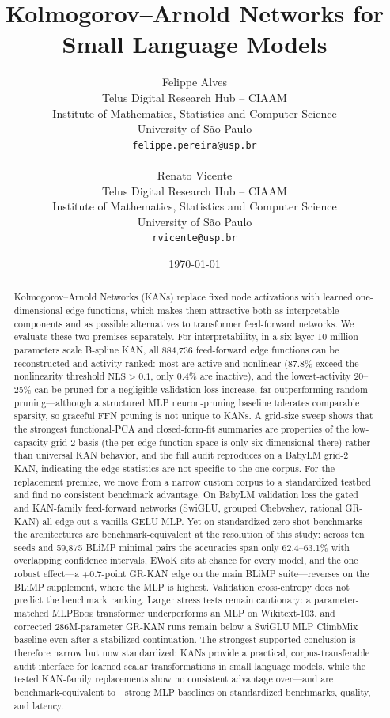 \documentclass[11pt]{article}
\title{Kolmogorov--Arnold Networks for Small Language Models}
\author{%
  Felippe Alves \\
  Telus Digital Research Hub -- CIAAM \\
  Institute of Mathematics, Statistics and Computer Science \\
  University of São Paulo \\
  \texttt{felippe.pereira@usp.br}\\
  \\
  Renato Vicente \\
  Telus Digital Research Hub -- CIAAM \\
  Institute of Mathematics, Statistics and Computer Science \\
  University of São Paulo \\
  \texttt{rvicente@usp.br}
}
\date{\today}
\newcommand{\modelname}[1]{\textsc{#1}}
\newcommand{\nls}{\mathrm{NLS}}
\newcommand{\grkan}{\modelname{GR-KAN}}
\newcommand{\mlpedge}{\modelname{MLPEdge}}
\begin{document}
\maketitle

\begin{abstract}
Kolmogorov--Arnold Networks (KANs) replace fixed node activations with learned one-dimensional edge functions, which makes them attractive both as interpretable components and as possible alternatives to transformer feed-forward networks. We evaluate these two premises separately. For interpretability, in a six-layer 10 million parameters scale B-spline KAN, all 884,736 feed-forward edge functions can be reconstructed and activity-ranked: most are active and nonlinear (87.8\% exceed the nonlinearity threshold \(\nls>0.1\), only 0.4\% are inactive), and the lowest-activity 20--25\% can be pruned for a negligible validation-loss increase, far outperforming random pruning---although a structured MLP neuron-pruning baseline tolerates comparable sparsity, so graceful FFN pruning is not unique to KANs. A grid-size sweep shows that the strongest functional-PCA and closed-form-fit summaries are properties of the low-capacity grid-2 basis (the per-edge function space is only six-dimensional there) rather than universal KAN behavior, and the full audit reproduces on a BabyLM grid-2 KAN, indicating the edge statistics are not specific to the one corpus. For the replacement premise, we move from a narrow custom corpus to a standardized testbed and find no consistent benchmark advantage. On BabyLM validation loss the gated and KAN-family feed-forward networks (SwiGLU, grouped Chebyshev, rational \grkan{}) all edge out a vanilla GELU MLP. Yet on standardized zero-shot benchmarks the architectures are benchmark-equivalent at the resolution of this study: across ten seeds and 59,875 BLiMP minimal pairs the accuracies span only 62.4--63.1\% with overlapping confidence intervals, EWoK sits at chance for every model, and the one robust effect---a \(+0.7\)-point \grkan{} edge on the main BLiMP suite---reverses on the BLiMP supplement, where the MLP is highest. Validation cross-entropy does not predict the benchmark ranking. Larger stress tests remain cautionary: a parameter-matched \mlpedge{} transformer underperforms an MLP on Wikitext-103, and corrected 286M-parameter \grkan{} runs remain below a SwiGLU MLP ClimbMix baseline even after a stabilized continuation. The strongest supported conclusion is therefore narrow but now standardized: KANs provide a practical, corpus-transferable audit interface for learned scalar transformations in small language models, while the tested KAN-family replacements show no consistent advantage over---and are benchmark-equivalent to---strong MLP baselines on standardized benchmarks, quality, and latency.
\end{abstract}
\end{document}
